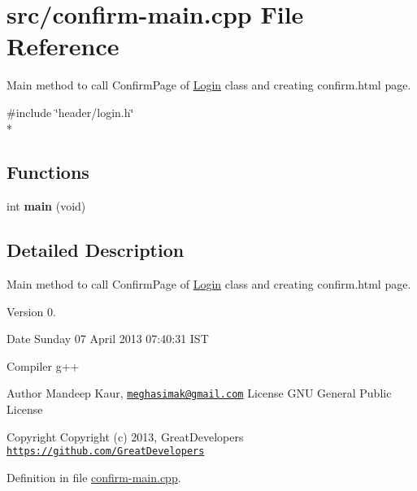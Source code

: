 \hypertarget{confirm-main_8cpp}{\section{src/confirm-\/main.cpp File Reference}
\label{confirm-main_8cpp}
}


Main method to call Confirm\-Page of \hyperlink{classLogin}{Login} class and creating confirm.\-html page.  


{\ttfamily \#include \char`\"{}header/login.\-h\char`\"{}}\\*
\subsection*{Functions}
\begin{DoxyCompactItemize}
\item 
\hypertarget{confirm-main_8cpp_a840291bc02cba5474a4cb46a9b9566fe}{int {\bfseries main} (void)}\label{confirm-main_8cpp_a840291bc02cba5474a4cb46a9b9566fe}

\end{DoxyCompactItemize}


\subsection{Detailed Description}
Main method to call Confirm\-Page of \hyperlink{classLogin}{Login} class and creating confirm.\-html page. \begin{DoxyVersion}{Version}
0. 
\end{DoxyVersion}
\begin{DoxyDate}{Date}
Sunday 07 April 2013 07\-:40\-:31 I\-S\-T\par
 Compiler g++
\end{DoxyDate}
\begin{DoxyAuthor}{Author}
Mandeep Kaur, \href{mailto:meghasimak@gmail.com}{\tt meghasimak@gmail.\-com} License G\-N\-U General Public License 
\end{DoxyAuthor}
\begin{DoxyCopyright}{Copyright}
Copyright (c) 2013, Great\-Developers \href{https://github.com/GreatDevelopers}{\tt https\-://github.\-com/\-Great\-Developers} 
\end{DoxyCopyright}


Definition in file \hyperlink{confirm-main_8cpp_source}{confirm-\/main.\-cpp}.

